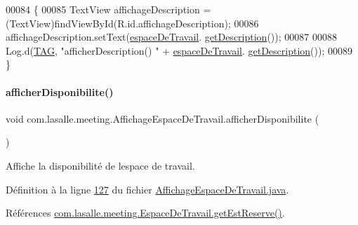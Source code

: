 \begin{DoxyCode}
00084     \{
00085         TextView affichageDescription = (TextView)findViewById(R.id.affichageDescription);
00086         affichageDescription.setText(\hyperlink{classcom_1_1lasalle_1_1meeting_1_1_affichage_espace_de_travail_a934d41c1c41882b94b65a95cee5aca13}{espaceDeTravail}.
      \hyperlink{classcom_1_1lasalle_1_1meeting_1_1_espace_de_travail_a815ecee3f01117f2d9b1d9441b214907}{getDescription}());
00087 
00088         Log.d(\hyperlink{classcom_1_1lasalle_1_1meeting_1_1_affichage_espace_de_travail_a8606eb11c7b28f52226544de431d86a4}{TAG}, \textcolor{stringliteral}{"afficherDescription() "} + \hyperlink{classcom_1_1lasalle_1_1meeting_1_1_affichage_espace_de_travail_a934d41c1c41882b94b65a95cee5aca13}{espaceDeTravail}.
      \hyperlink{classcom_1_1lasalle_1_1meeting_1_1_espace_de_travail_a815ecee3f01117f2d9b1d9441b214907}{getDescription}());
00089     \}
\end{DoxyCode}
\mbox{\label{classcom_1_1lasalle_1_1meeting_1_1_affichage_espace_de_travail_a597703fc6f7e82b79ac7047640fa9323}} 
\paragraph{\texorpdfstring{afficher\+Disponibilite()}{afficherDisponibilite()}}
{\footnotesize\ttfamily void com.\+lasalle.\+meeting.\+Affichage\+Espace\+De\+Travail.\+afficher\+Disponibilite (\begin{DoxyParamCaption}{ }\end{DoxyParamCaption})}



Affiche la disponibilité de l\textquotesingle{}espace de travail. 



Définition à la ligne \hyperlink{_affichage_espace_de_travail_8java_source_l00127}{127} du fichier \hyperlink{_affichage_espace_de_travail_8java_source}{Affichage\+Espace\+De\+Travail.\+java}.



Références \hyperlink{_espace_de_travail_8java_source_l00117}{com.\+lasalle.\+meeting.\+Espace\+De\+Travail.\+get\+Est\+Reserve()}.



